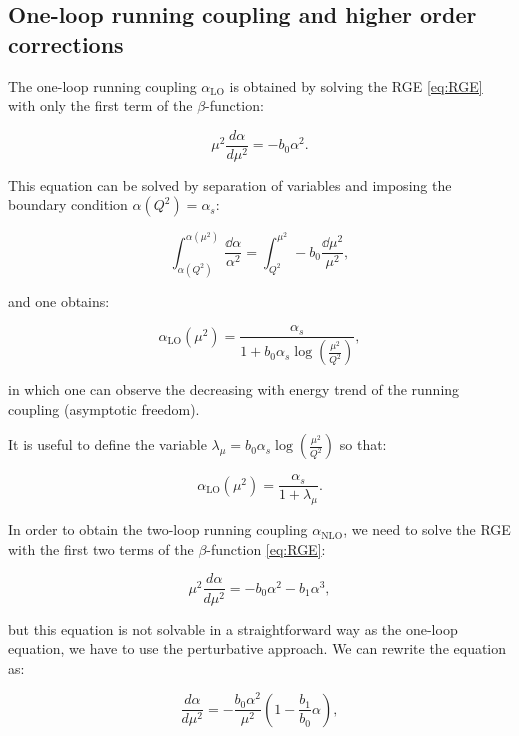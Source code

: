 \documentclass[../Tesi_Jiahao_Miao_986136.tex]{subfiles}
\begin{document}
\subsection{One-loop running coupling and higher order corrections}

The one-loop running coupling $\alpha_{\text{LO}}$ is obtained by solving the RGE \cref{eq:RGE} with only the first term of the $\beta$-function:

\begin{equation}
    \mu^2 \frac{d\alpha}{d\mu^2} = - b_0 \alpha^2.
\end{equation}

This equation can be solved by separation of variables and imposing 
the boundary condition $\alpha(Q^2) = \alpha_s$:

\begin{equation}
   \int_{\alpha(Q^2)}^{\alpha(\mu^2)} \frac{\dd\alpha}{\alpha^2} = \int _{Q^2}^{\mu^2}-b_0 \frac{\dd\mu^2}{\mu^2},
\end{equation}

and one obtains:

\begin{equation}
    \alpha_{\text{LO}}(\mu^2) = \frac{\alpha_s}{1+b_0 \alpha_s \log(\frac{\mu^2}{Q^2})},
\end{equation}

in which one can observe the decreasing with energy trend of the running coupling (asymptotic freedom).  

It is useful to define the variable $\lambda_\mu = b_0 \alpha_s \log(\frac{\mu^2}{Q^2})$ so that:

\begin{equation}\label{eq:LO running coupling}
    \alpha_{\text{LO}}(\mu^2) = \frac{\alpha_s}{1+\lambda_\mu}.
\end{equation}

In order to obtain the two-loop running coupling $\alpha_{\text{NLO}}$, 
we need to solve the RGE with the first two terms of the $\beta$-function \cref{eq:RGE}:

\begin{equation}
    \mu^2 \frac{d\alpha}{d\mu^2} = - b_0 \alpha^2 - b_1 \alpha^3,
\end{equation}

but this equation is not solvable in a straightforward way as the one-loop equation, 
we have to use the perturbative approach. We can rewrite the equation as:

\begin{equation}
    \frac{d\alpha}{d\mu^2} = - \frac{b_0 \alpha^2}{\mu^2} ( 1 - \frac{b_1}{b_0} \alpha ),
\end{equation}
\end{document}
